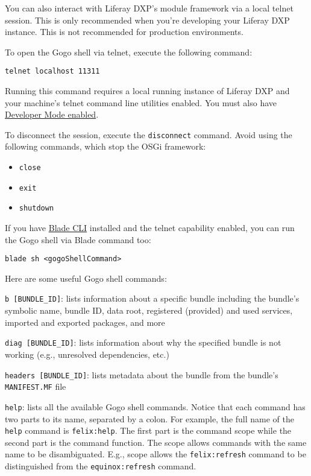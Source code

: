 You can also interact with Liferay DXP's module framework via a local
telnet session. This is only recommended when you're developing your
Liferay DXP instance. This is not recommended for production
environments.

To open the Gogo shell via telnet, execute the following command:

\begin{verbatim}
telnet localhost 11311
\end{verbatim}

Running this command requires a local running instance of Liferay DXP
and your machine's telnet command line utilities enabled. You must also
have
\href{/docs/7-2/frameworks/-/knowledge_base/f/using-developer-mode-with-themes\#enabling-developer-mode-manually}{Developer
Mode enabled}.

To disconnect the session, execute the \texttt{disconnect} command.
Avoid using the following commands, which stop the OSGi framework:

\begin{itemize}
\tightlist
\item
  \texttt{close}
\item
  \texttt{exit}
\item
  \texttt{shutdown}
\end{itemize}

If you have
\href{/docs/7-2/reference/-/knowledge_base/r/blade-cli}{Blade CLI}
installed and the telnet capability enabled, you can run the Gogo shell
via Blade command too:

\begin{verbatim}
blade sh <gogoShellCommand>
\end{verbatim}

Here are some useful Gogo shell commands:

\texttt{b\ {[}BUNDLE\_ID{]}}: lists information about a specific bundle
including the bundle's symbolic name, bundle ID, data root, registered
(provided) and used services, imported and exported packages, and more

\texttt{diag\ {[}BUNDLE\_ID{]}}: lists information about why the
specified bundle is not working (e.g., unresolved dependencies, etc.)

\texttt{headers\ {[}BUNDLE\_ID{]}}: lists metadata about the bundle from
the bundle's \texttt{MANIFEST.MF} file

\texttt{help}: lists all the available Gogo shell commands. Notice that
each command has two parts to its name, separated by a colon. For
example, the full name of the \texttt{help} command is
\texttt{felix:help}. The first part is the command scope while the
second part is the command function. The scope allows commands with the
same name to be disambiguated. E.g., scope allows the
\texttt{felix:refresh} command to be distinguished from the
\texttt{equinox:refresh} command.

